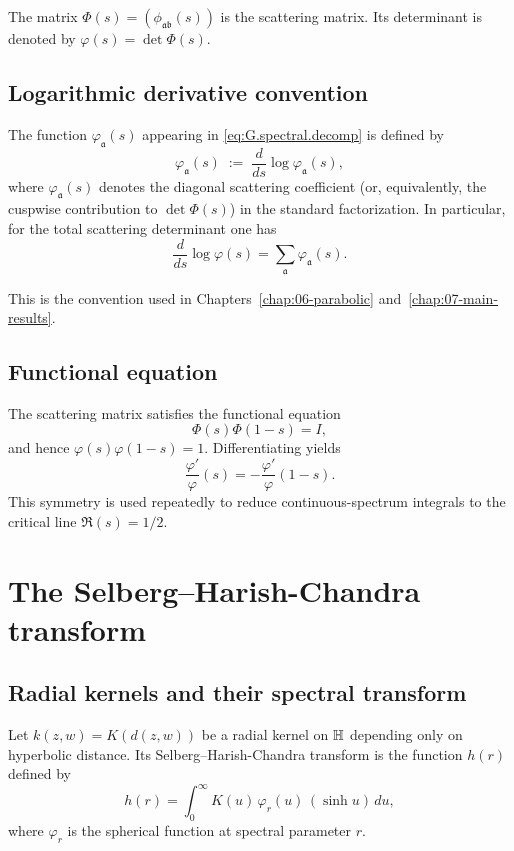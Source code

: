 The matrix $\Phi(s)=(\phi_{\mathfrak{a}\mathfrak{b}}(s))$ is the scattering matrix.
Its determinant is denoted by $\varphi(s)=\det\Phi(s)$.

\subsection{Logarithmic derivative convention}
\label{subsec:G.logder}

The function $\varphi_{\mathfrak{a}}(s)$ appearing in \eqref{eq:G.spectral.decomp} is defined by
\begin{equation}\label{eq:G.varphi.a}
\varphi_{\mathfrak{a}}(s)
\;:=\;
\frac{d}{ds}\log \varphi_{\mathfrak{a}}(s),
\end{equation}
where $\varphi_{\mathfrak{a}}(s)$ denotes the diagonal scattering coefficient (or, equivalently, the cuspwise
contribution to $\det\Phi(s)$) in the standard factorization.
In particular, for the total scattering determinant one has
\[
\frac{d}{ds}\log\varphi(s)
=
\sum_{\mathfrak{a}}\varphi_{\mathfrak{a}}(s).
\]

This is the convention used in Chapters~\ref{chap:06-parabolic} and~\ref{chap:07-main-results}.

\subsection{Functional equation}
\label{subsec:G.func.eq}

The scattering matrix satisfies the functional equation
\[
\Phi(s)\Phi(1-s)=I,
\]
and hence $\varphi(s)\varphi(1-s)=1$.
Differentiating yields
\begin{equation}\label{eq:G.logder.func.eq}
\frac{\varphi'}{\varphi}(s)
=
-\frac{\varphi'}{\varphi}(1-s).
\end{equation}
This symmetry is used repeatedly to reduce continuous-spectrum integrals to the critical line $\Re(s)=1/2$.

\section{The Selberg--Harish-Chandra transform}
\label{sec:G.selberg.transform}

\subsection{Radial kernels and their spectral transform}
\label{subsec:G.shc}

Let $k(z,w)=K(d(z,w))$ be a radial kernel on $\mathbb{H}$ depending only on hyperbolic distance.
Its Selberg--Harish-Chandra transform is the function $h(r)$ defined by
\begin{equation}\label{eq:G.shc.def}
h(r)
=
\int_0^\infty K(u)\,\varphi_r(u)\,(\sinh u)\,du,
\end{equation}
where $\varphi_r$ is the spherical function at spectral parameter $r$.

